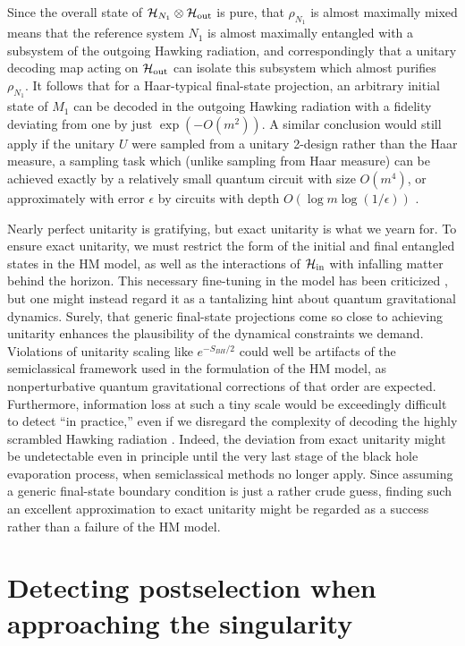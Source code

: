 \documentclass[11pt]{article}
\begin{document}
Since the overall state of $\mathcal{H}_{N_1}\otimes\mathcal{H}_{\rm out}$ is pure, that $\rho_{N_1}$ is almost maximally mixed means that the reference system $N_1$ is almost maximally entangled with a subsystem of the outgoing Hawking radiation, and correspondingly that a unitary decoding map acting on $\mathcal{H}_{\rm out}$ can isolate this subsystem which almost purifies $\rho_{N_1}$. It follows that for a Haar-typical final-state projection, an arbitrary initial state of $M_1$ can be decoded in the outgoing Hawking radiation with a fidelity deviating from one by just $\exp\left(-O(m^2)\right)$. A similar conclusion would still apply if the unitary $U$ were sampled from a unitary 2-design rather than the Haar measure, a sampling task which (unlike sampling from Haar measure) can be achieved exactly by a relatively small quantum circuit with size $O(m^4)$, or approximately with error $\epsilon$ by circuits with depth $O\left(\log m\log(1/\epsilon)\right)$ \cite{cleve}. 

Nearly perfect unitarity is gratifying, but exact unitarity is what we yearn for. To ensure exact unitarity, we must restrict the form of the initial and final entangled states in the HM model, as well as the interactions of $\mathcal{H}_{\rm in}$ with infalling matter behind the horizon. This necessary fine-tuning in the model has been criticized \cite{gottesman,lloyd}, but one might instead regard it as a tantalizing hint about quantum gravitational dynamics. Surely, that generic final-state projections come so close to achieving unitarity enhances the plausibility of the dynamical constraints we demand. Violations of unitarity scaling like $e^{-S_{BH}/2}$ could well be artifacts of the semiclassical framework used in the formulation of the HM model, as nonperturbative quantum gravitational corrections of that order are expected. Furthermore, information loss at such a tiny scale would be exceedingly difficult to detect ``in practice,'' even if we disregard the complexity of decoding the highly scrambled Hawking radiation \cite{harlow-hayden}. Indeed, the deviation from exact unitarity might be undetectable even in principle until the very last stage of the black hole evaporation process, when semiclassical methods no longer apply. Since assuming a generic final-state boundary condition is just a rather crude guess, finding such an excellent approximation to exact unitarity might be regarded as a success rather than a failure of the HM model.

\section{Detecting postselection when approaching the singularity}
\label{sec:detecting}
\end{document}
